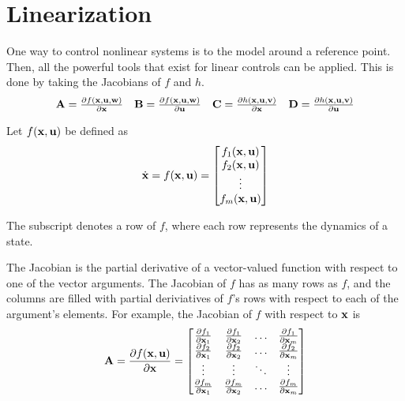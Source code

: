\section{Linearization}

One way to control nonlinear \glspl{system} is to
 the \gls{model} around a reference point.
Then, all the powerful tools that exist for linear controls can be applied. This
is done by taking the Jacobians of $f$ and $h$.
\begin{align*}
  \begin{array}{cccc}
    \mathbf{A} = \frac{\partial f(\mathbf{x}, \mathbf{u}, \mathbf{w})}{\partial \mathbf{x}} &
    \mathbf{B} = \frac{\partial f(\mathbf{x}, \mathbf{u}, \mathbf{w})}{\partial \mathbf{u}} &
    \mathbf{C} = \frac{\partial h(\mathbf{x}, \mathbf{u}, \mathbf{v})}{\partial \mathbf{x}} &
    \mathbf{D} = \frac{\partial h(\mathbf{x}, \mathbf{u}, \mathbf{v})}{\partial \mathbf{u}}
  \end{array}
\end{align*}

Let $f(\mathbf{x}, \mathbf{u})$ be defined as
\begin{equation*}
  \dot{\mathbf{x}} = f(\mathbf{x}, \mathbf{u}) =
  \begin{bmatrix}
    f_1(\mathbf{x}, \mathbf{u}) \\
    f_2(\mathbf{x}, \mathbf{u}) \\
    \vdots \\
    f_m(\mathbf{x}, \mathbf{u})
  \end{bmatrix}
\end{equation*}

The subscript denotes a row of $f$, where each row represents the dynamics of a
state.

The Jacobian is the partial derivative of a vector-valued function with respect
to one of the vector arguments. The Jacobian of $f$ has as many rows as $f$, and
the columns are filled with partial deriviatives of $f$'s rows with respect to
each of the argument's elements. For example, the Jacobian of $f$ with respect
to $\mathbf{x}$ is
\begin{equation*}
  \mathbf{A} = \frac{\partial f(\mathbf{x}, \mathbf{u})}{\partial \mathbf{x}} =
  \begin{bmatrix}
    \frac{\partial f_1}{\partial \mathbf{x}_1} &
      \frac{\partial f_1}{\partial \mathbf{x}_2} & \hdots &
      \frac{\partial f_1}{\partial \mathbf{x}_m} \\
    \frac{\partial f_2}{\partial \mathbf{x}_1} &
      \frac{\partial f_2}{\partial \mathbf{x}_2} & \hdots &
      \frac{\partial f_2}{\partial \mathbf{x}_m} \\
    \vdots & \vdots & \ddots & \vdots \\
    \frac{\partial f_m}{\partial \mathbf{x}_1} &
      \frac{\partial f_m}{\partial \mathbf{x}_2} & \hdots &
      \frac{\partial f_m}{\partial \mathbf{x}_m}
  \end{bmatrix}
\end{equation*}


